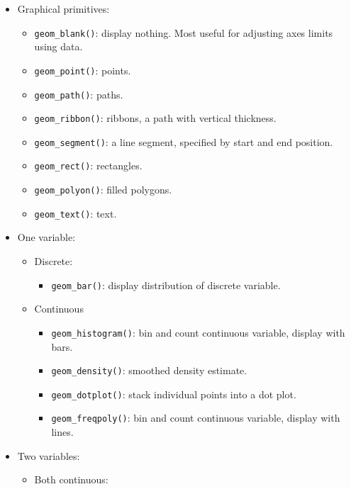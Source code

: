 \begin{itemize}
\tightlist
\item
  Graphical primitives:

  \begin{itemize}
  \tightlist
  \item
    \texttt{geom\_blank()}: display nothing. Most useful for adjusting
    axes limits using data.
  \item
    \texttt{geom\_point()}: points.
  \item
    \texttt{geom\_path()}: paths.
  \item
    \texttt{geom\_ribbon()}: ribbons, a path with vertical thickness.
  \item
    \texttt{geom\_segment()}: a line segment, specified by start and end
    position.
  \item
    \texttt{geom\_rect()}: rectangles.
  \item
    \texttt{geom\_polyon()}: filled polygons.
  \item
    \texttt{geom\_text()}: text.
  \end{itemize}
\item
  One variable:

  \begin{itemize}
  \tightlist
  \item
    Discrete:

    \begin{itemize}
    \tightlist
    \item
      \texttt{geom\_bar()}: display distribution of discrete variable.
    \end{itemize}
  \item
    Continuous

    \begin{itemize}
    \tightlist
    \item
      \texttt{geom\_histogram()}: bin and count continuous variable,
      display with bars.
    \item
      \texttt{geom\_density()}: smoothed density estimate.
    \item
      \texttt{geom\_dotplot()}: stack individual points into a dot plot.
    \item
      \texttt{geom\_freqpoly()}: bin and count continuous variable,
      display with lines.
    \end{itemize}
  \end{itemize}
\item
  Two variables:

  \begin{itemize}
  \tightlist
  \item
    Both continuous:


\end{itemize}
\end{itemize}
